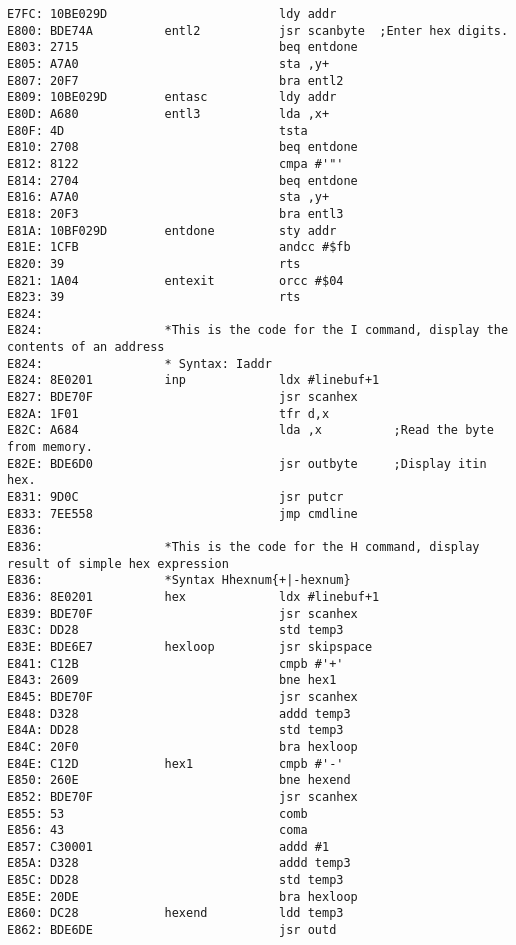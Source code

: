 {\begin{verbatim}
E7FC: 10BE029D                        ldy addr
E800: BDE74A          entl2           jsr scanbyte  ;Enter hex digits.
E803: 2715                            beq entdone
E805: A7A0                            sta ,y+
E807: 20F7                            bra entl2
E809: 10BE029D        entasc          ldy addr
E80D: A680            entl3           lda ,x+
E80F: 4D                              tsta
E810: 2708                            beq entdone
E812: 8122                            cmpa #'"'
E814: 2704                            beq entdone
E816: A7A0                            sta ,y+
E818: 20F3                            bra entl3
E81A: 10BF029D        entdone         sty addr
E81E: 1CFB                            andcc #$fb
E820: 39                              rts
E821: 1A04            entexit         orcc #$04
E823: 39                              rts
E824:                 
E824:                 *This is the code for the I command, display the contents of an address
E824:                 * Syntax: Iaddr
E824: 8E0201          inp             ldx #linebuf+1
E827: BDE70F                          jsr scanhex
E82A: 1F01                            tfr d,x
E82C: A684                            lda ,x          ;Read the byte from memory.
E82E: BDE6D0                          jsr outbyte     ;Display itin hex.
E831: 9D0C                            jsr putcr
E833: 7EE558                          jmp cmdline              
E836:                 
E836:                 *This is the code for the H command, display result of simple hex expression
E836:                 *Syntax Hhexnum{+|-hexnum}
E836: 8E0201          hex             ldx #linebuf+1
E839: BDE70F                          jsr scanhex
E83C: DD28                            std temp3
E83E: BDE6E7          hexloop         jsr skipspace
E841: C12B                            cmpb #'+'
E843: 2609                            bne hex1
E845: BDE70F                          jsr scanhex
E848: D328                            addd temp3
E84A: DD28                            std temp3
E84C: 20F0                            bra hexloop
E84E: C12D            hex1            cmpb #'-'
E850: 260E                            bne hexend
E852: BDE70F                          jsr scanhex
E855: 53                              comb
E856: 43                              coma
E857: C30001                          addd #1
E85A: D328                            addd temp3
E85C: DD28                            std temp3
E85E: 20DE                            bra hexloop
E860: DC28            hexend          ldd temp3
E862: BDE6DE                          jsr outd

\end{verbatim}}
